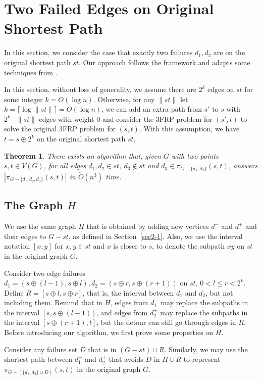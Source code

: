 \documentclass[11pt]{article}
\theoremstyle{plain}
\newtheorem{theorem}{Theorem}[section]
\theoremstyle{definition}
\newcommand{\too}[1]{\tilde{O}({#1})}
\newcommand{\set}[1]{\{ #1 \}}
\newcommand{\og}[3]{\pi_{G-#3}\left(#1,#2\right)}
\begin{document}
 \section{Two Failed Edges on Original Shortest Path}\label{sec:2-edge}

In this section, we consider the case that exactly two failures $d_1,d_2$ are on the original shortest path $st$. Our approach follows the framework and adapts some techniques from \cite{duan2009dual}.

In this section, without loss of generality, we assume there are $2^k$ edges on $st$ for some integer $k=O(\log n)$. Otherwise, for any $\| st \|$ let $k=\lceil \log \| st \| \rceil = O(\log n)$, we can add an extra path from $s'$ to $s$ with $2^k - \| st \|$ edges with weight $0$ and consider the 3FRP problem for $(s',t)$ to solve the original 3FRP problem for $(s,t)$. With this assumption, we have $t=s \oplus 2^k$ on the original shortest path $st$. 


\begin{theorem}
There exists an algorithm that, given $G$ with two points $s,t \in V(G)$, for all edges $d_1,d_2 \in st$, $d_3 \not \in st$ and $d_3 \in \og{s}{t}{\set{d_1, d_2}}$, answers $|\og{s}{t}{\set{d_1, d_2, d_3}}|$ in $\too{n^3}$ time.
\end{theorem}

\subsection{The Graph $H$}

We use the same graph $H$ that is obtained by adding new vertices $d^-$ and $d^+$ and their edges to $G-st$, as defined in Section~\ref{sec2-1}. Also, we use the interval notation $[x,y]$ for $x,y\in st$ and $x$ is closer to $s$, to denote the subpath $xy$ on $st$ in the original graph $G$. 

Consider two edge failures $d_1=(s \oplus (l-1), s \oplus l),d_2=(s \oplus r, s \oplus (r+1))$ on $st$, $0 < l \leq r < 2^k$. Define $R=[s \oplus l, s\oplus r]$, that is, the interval between $d_1$ and $d_2$, but not including them. Remind that in $H$, edges from $d_1^-$ may replace the subpaths in the interval $[s, s \oplus (l-1)]$, and edges from $d_2^+$ may replace the subpaths in the interval $[s \oplus (r+1), t]$, but the detour can still go through edges in $R$. Before introducing our algorithm, we first prove some properties on $H$.

Consider any failure set $D$ that is in $(G-st) \cup R$. Similarly, we may use the shortest path between $d_1^-$ and $d_2^+$ that avoids $D$ in $H \cup R$ to represent $\og{s}{t}{(\set{d_1,d_2} \cup D)}$ in the original graph $G$. 
\end{document}
